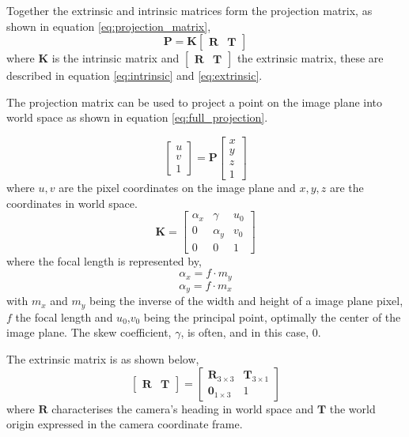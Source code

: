 \noindent
Together the extrinsic and intrinsic matrices form the projection matrix,
as shown in equation \ref{eq:projection_matrix},
\begin{equation} \label{eq:projection_matrix}
    \bm{P} = \bm{K}
    \begin{bmatrix}
        \bm{R} & \bm{T}
    \end{bmatrix}
\end{equation}
where \(\bm{K}\) is the intrinsic matrix and \(\begin{bmatrix} \bm{R} & \bm{T} \end{bmatrix}\) the extrinsic matrix, these are described
in equation \ref{eq:intrinsic} and \ref{eq:extrinsic}.

The projection matrix can be used to project a point on the image plane into world space as shown in equation \ref{eq:full_projection}.

\begin{equation} \label{eq:full_projection}
    \begin{bmatrix}
        u \\
        v \\
        1
    \end{bmatrix}
    = \bm{P}
    \begin{bmatrix}
        x \\
        y \\
        z \\
        1
    \end{bmatrix}
\end{equation}
where \(u,v\) are the pixel coordinates on the image plane and \(x,y,z\) are the coordinates in world space.
\begin{equation} \label{eq:intrinsic}
    \bm{K} =
    \begin{bmatrix}
        \alpha_x & \gamma   & u_0 \\
        0        & \alpha_y & v_0 \\
        0        & 0        & 1
    \end{bmatrix}
\end{equation}
where the focal length is represented by,
\[\alpha_x = f \cdot m_y\]
\[\alpha_y = f \cdot m_x\]
with \(m_x\) and \(m_y\) being the inverse of the width and height of a image plane pixel, \(f\) the focal length and \(u_0\),\(v_0\) being the principal point, optimally the center of the image plane.
The skew coefficient, \(\gamma\), is often, and in this case, 0.

The extrinsic matrix is as shown below,
\begin{equation}\label{eq:extrinsic}
    \begin{bmatrix}
        \bm{R} & \bm{T}
    \end{bmatrix}
    =
    \begin{bmatrix}
        \bm{R}_{3\times3} & \bm{T}_{3\times1} \\
        \bm{0}_{1\times3} & 1
    \end{bmatrix}
\end{equation}
where \(\bm{R}\) characterises the camera's heading in world space and \(\bm{T}\) the world origin expressed in 
the camera coordinate frame.

